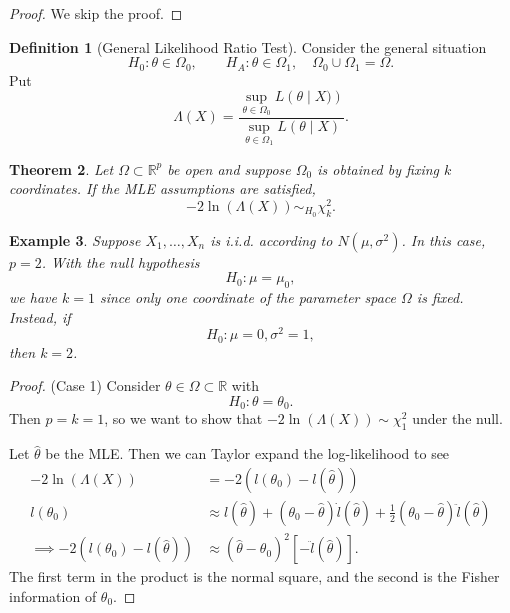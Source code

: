\documentclass{tufte-handout}
\newcommand*\R{\mathbb{R}}
\newtheorem{thm}{Theorem}[subsection]
\newtheorem{ex}[thm]{Example}
\theoremstyle{definition}
\newtheorem{defn}[thm]{Definition}
\begin{document}
\begin{proof}
	We skip the proof.
\end{proof}

\begin{defn}[General Likelihood Ratio Test]
	Consider the general situation \[
		H_0: \theta \in \Omega_0, \qquad H_A: \theta \in \Omega_1, \quad \Omega_0 \cup \Omega_1 = \Omega
	.\] Put \[
		\Lambda(X) = \frac{\sup_{\theta \in \Omega_0} L\left(\theta \mid X) \right)}{\sup_{\theta \in \Omega_1} L(\theta \mid X)}
	.\] 
\end{defn}

\begin{thm}
	Let $\Omega \subset \R^p$ be open and suppose $\Omega_0$ is obtained by fixing $k$ coordinates. If the MLE assumptions are satisfied, \[
		-2 \ln{\left(\Lambda(X)\right)} \sim_{H_0} \chi_k^2
	.\] 
\end{thm}

\begin{ex}
	Suppose $X_1,\ldots,X_n$ is i.i.d. according to $N(\mu,\sigma^2)$. In this case, $p = 2$. With the null hypothesis \[
		H_0: \mu = \mu_0
	,\] we have $k=1$ since only one coordinate of the parameter space $\Omega$ is fixed. Instead, if \[
		H_0: \mu=0, \sigma^2 = 1
	,\] then $k=2$.
\end{ex}

\begin{proof}
	(Case 1) Consider $\theta \in \Omega \subset \R$ with \[
		H_0: \theta = \theta_0
	.\] Then $p = k = 1$, so we want to show that $-2\ln{\left(\Lambda(X)\right)}\sim \chi^2_1$ under the null.

	Let $\hat{\theta}$ be the MLE. Then we can Taylor expand the log-likelihood to see
	\begin{align*}
		-2 \ln{\left(\Lambda(X)\right)} &= -2\left( l(\theta_0) - l(\hat{\theta}) \right) \\
		l(\theta_0) &\approx l(\hat{\theta}) + (\theta_0-\hat{\theta})\dot{l}(\hat{\theta}) + \frac{1}{2} (\theta_0-\hat{\theta})\ddot{l}(\hat{\theta}) \\
		\implies -2 \left( l(\theta_0) -l(\hat{\theta}) \right) &\approx \left( \hat{\theta}-\theta_0 \right)^2 \left[ -\ddot{l}(\hat{\theta}) \right]
	.\end{align*}
	The first term in the product is the normal square, and the second is the Fisher information of $\theta_0$.
\end{proof}
\end{document}
